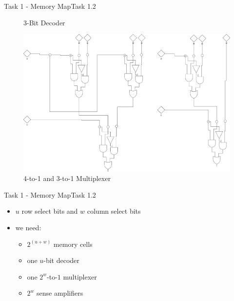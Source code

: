 \begin{frame}[allowframebreaks]{Task 1 - Memory Map}{Task 1.2\vspace{0.25cm}}
\begin{figure}
    \caption{3-Bit Decoder}
  \end{figure}
  \begin{figure}
    \centering
    \includegraphics[height=0.6\paperheight]{./figures/3_to_1_multiplexer.png}
    \caption{4-to-1 and 3-to-1 Multiplexer}
  \end{figure}
\end{frame}

\begin{frame}{Task 1 - Memory Map}{Task 1.2\vspace{0.25cm}}
  \begin{itemize}
    \item $u$ \alert{row} select bits and $w$ \alert{column} select bits
    \item \alert{we need:}
    \begin{itemize}
      \item $2^{(u+w)}$ memory cells
      \item one $u$-bit decoder
      \item one $2^w$-to-$1$ multiplexer
      \item $2^w$ sense amplifiers
    \end{itemize}
  \end{itemize}
\end{frame}

